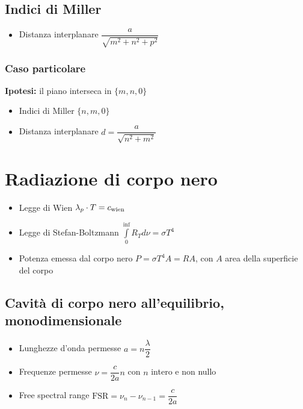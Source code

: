 \documentclass{article}
\begin{document}
\subsection{Indici di Miller}
\begin{itemize}
  \item Distanza interplanare \( \displaystyle \dfrac{a}{\sqrt{m ^ 2 + n ^ 2 + p ^ 2}} \)
\end{itemize}

\subsubsection{Caso particolare}
\textbf{Ipotesi:} il piano interseca in \( \{m, n, 0\} \)
\begin{itemize}
  \item Indici di Miller \( \{n, m, 0\} \)
  \item Distanza interplanare \( d = \dfrac{a}{\sqrt{n^2+m^2}} \)
\end{itemize}

\newpage

\section{Radiazione di corpo nero}
\begin{itemize}
  \item Legge di Wien \( \lambda_{p} \cdot T = c_{\textnormal{wien}} \)
  \item Legge di Stefan-Boltzmann \( \displaystyle \int\limits_{0}^{\inf} R_T d \nu = \sigma T ^ 4 \)
  \item Potenza emessa dal corpo nero \( P = \sigma T^4 A = R A \), con \(A\) area della superficie del corpo
\end{itemize}
\subsection{Cavità di corpo nero all'equilibrio, monodimensionale}
\begin{itemize}
  \item Lunghezze d'onda permesse \( a = n \dfrac{\lambda}{2} \)
  \item Frequenze permesse \( \nu = \dfrac{c}{2a} n \) con \( n \) intero e non nullo
  \item Free spectral range \( \text{FSR} = \nu_n - \nu_{n-1} = \dfrac{c}{2a} \)
\end{itemize}

\newpage
\end{document}
